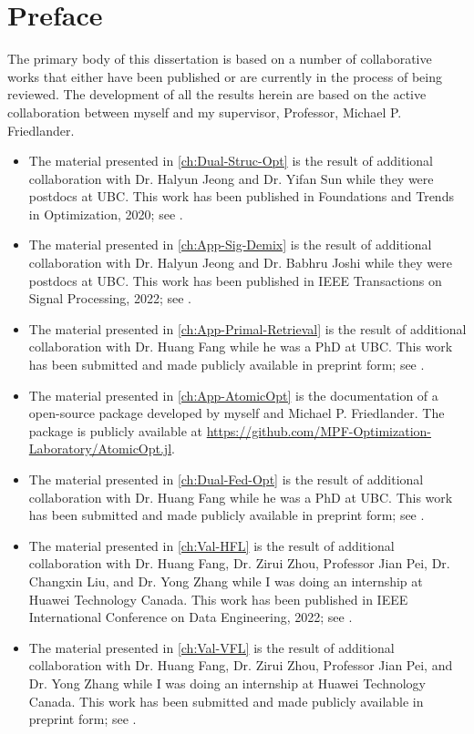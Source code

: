 
\chapter{Preface}

The primary body of this dissertation is based on a number of collaborative works that either have been published or are currently in the process of being reviewed. The development of all the results herein are based on the active collaboration between myself and my supervisor, Professor, Michael P. Friedlander.

\begin{itemize}
    \item The material presented in \autoref{ch:Dual-Struc-Opt} is the result of additional collaboration with Dr. Halyun Jeong and Dr. Yifan Sun while they were postdocs at UBC. This work has been published in Foundations and Trends in Optimization, 2020; see \citet{fan2019alignment}. 
    \item The material presented in \autoref{ch:App-Sig-Demix} is the result of additional collaboration with Dr. Halyun Jeong and Dr. Babhru Joshi while they were postdocs at UBC. This work has been published in IEEE Transactions on Signal Processing, 2022; see \citet{fan2020polar}. 
    \item The material presented in \autoref{ch:App-Primal-Retrieval} is the result of additional collaboration with Dr. Huang Fang while he was a PhD at UBC. This work has been submitted and made publicly available in preprint form; see \citet{fan2021safe}.
    \item The material presented in \autoref{ch:App-AtomicOpt} is the documentation of a open-source package developed by myself and Michael P. Friedlander. The package is publicly available at \url{https://github.com/MPF-Optimization-Laboratory/AtomicOpt.jl}. 
    \item The material presented in \autoref{ch:Dual-Fed-Opt} is the result of additional collaboration with Dr. Huang Fang while he was a PhD at UBC. This work has been submitted and made publicly available in preprint form; see \citet{fan2022dual}.
    \item The material presented in \autoref{ch:Val-HFL} is the result of additional collaboration with Dr. Huang Fang, Dr. Zirui Zhou, Professor Jian Pei, Dr. Changxin Liu, and Dr. Yong Zhang while I was doing an internship at Huawei Technology Canada. This work has been published in IEEE International Conference on Data Engineering, 2022; see \citet{fan2022improving}. 
    \item The material presented in \autoref{ch:Val-VFL} is the result of additional collaboration with Dr. Huang Fang, Dr. Zirui Zhou, Professor Jian Pei, and Dr. Yong Zhang while I was doing an internship at Huawei Technology Canada. This work has been submitted and made publicly available in preprint form; see \citet{fan2022fair}. 
\end{itemize}




 






